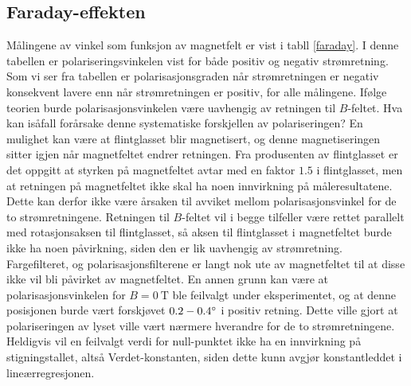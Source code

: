 \documentclass[%
 reprint,
 amsmath,amssymb,
 aps,
 norsk,
]{revtex4-1}
\begin{document}
\subsection{Faraday-effekten}
Målingene av vinkel som funksjon av magnetfelt er vist i tabll \vref{faraday}. I denne tabellen er polariseringsvinkelen vist for både positiv og negativ strømretning. Som vi ser fra tabellen er polarisasjonsgraden når strømretningen er negativ konsekvent lavere enn når strømretningen er positiv, for alle målingene. Ifølge teorien burde polarisasjonsvinkelen være uavhengig av retningen til $B$-feltet. Hva kan isåfall forårsake denne systematiske forskjellen av polariseringen? En mulighet kan være at flintglasset blir magnetisert, og denne magnetiseringen sitter igjen når magnetfeltet endrer retningen. Fra produsenten av flintglasset er det oppgitt at styrken på magnetfeltet avtar med en faktor $1.5$ i flintglasset, men at retningen på magnetfeltet ikke skal ha noen innvirkning på måleresultatene. Dette kan derfor ikke være årsaken til avviket mellom polarisasjonsvinkel for de to strømretningene. Retningen til $B$-feltet vil i begge tilfeller være rettet parallelt med rotasjonsaksen til flintglasset, så aksen til flintglasset i magnetfeltet burde ikke ha noen påvirkning, siden den er lik uavhengig av strømretning. Fargefilteret, og polarisasjonsfilterene er langt nok ute av magnetfeltet til at disse ikke vil bli påvirket av magnetfeltet. En annen grunn kan være at polarisasjonsvinkelen for $B=\SI{0}{\tesla}$ ble feilvalgt under eksperimentet, og at denne posisjonen burde vært forskjøvet $0.2-0.4\degree$ i positiv retning. Dette ville gjort at polariseringen av lyset ville vært nærmere hverandre for de to strømretningene. Heldigvis vil en feilvalgt verdi for null-punktet ikke ha en innvirkning på stigningstallet, altså Verdet-konstanten, siden dette kunn avgjør konstantleddet i lineærregresjonen.\\
\end{document}
